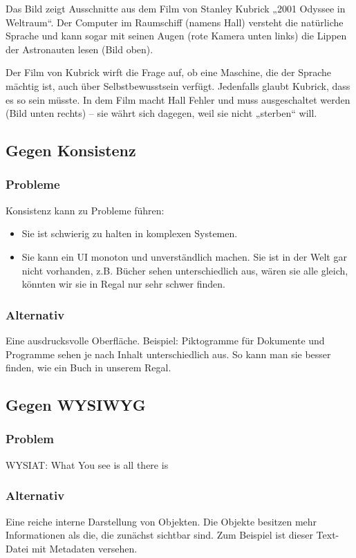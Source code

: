 Das Bild zeigt Ausschnitte aus dem Film von Stanley Kubrick „2001 Odyssee in Weltraum“. Der Computer im Raumschiff (namens Hall) versteht die natürliche Sprache und kann sogar  mit seinen Augen (rote Kamera unten links) die Lippen der Astronauten lesen (Bild oben). 

Der Film von Kubrick wirft die Frage auf, ob eine Maschine, die der Sprache mächtig ist, auch über Selbstbewusstsein verfügt. Jedenfalls glaubt Kubrick, dass es so sein müsste. In dem Film macht Hall Fehler und muss ausgeschaltet werden (Bild unten rechts) – sie währt sich dagegen, weil sie nicht „sterben“ will.


\subsection{Gegen Konsistenz}
\subsubsection*{Probleme}
Konsistenz kann zu Probleme führen:
\begin{itemize}
\item Sie ist schwierig zu halten in komplexen Systemen.
\item Sie kann ein UI monoton und unverständlich machen. Sie ist in der Welt gar nicht vorhanden, z.B. Bücher sehen unterschiedlich aus, wären sie alle gleich, könnten wir sie in Regal nur sehr schwer finden.
\end{itemize}

\subsubsection*{Alternativ}
Eine ausdrucksvolle Oberfläche. 
Beispiel: Piktogramme für Dokumente und Programme sehen je nach Inhalt unterschiedlich aus. So kann man sie besser finden, wie ein Buch in unserem Regal.


\subsection{Gegen WYSIWYG}
\subsubsection*{Problem}
WYSIAT: What You see is all there is

\subsubsection*{Alternativ}
Eine reiche interne Darstellung von Objekten. Die Objekte besitzen mehr Informationen als die, die zunächst sichtbar sind.
Zum Beispiel ist dieser Text-Datei mit Metadaten versehen.


